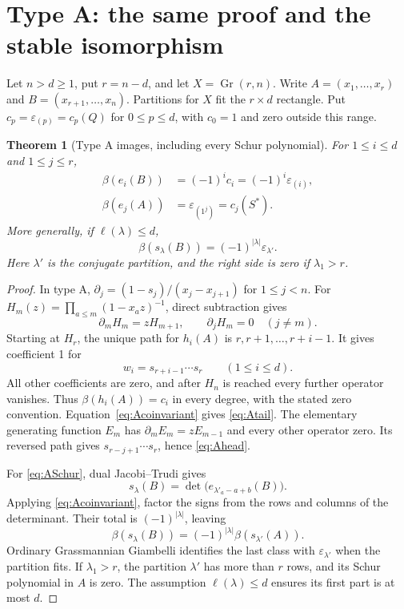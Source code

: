 \documentclass[11pt,letterpaper]{article}
\newtheorem{theorem}{Theorem}[section]
\theoremstyle{remark}
\newcommand{\eps}{\varepsilon}
\newcommand{\Gr}{\operatorname{Gr}}
\begin{document}
\section{Type A: the same proof and the stable isomorphism}
\label{sec:A}

Let $n>d\geq1$, put $r=n-d$, and let $X=\Gr(r,n)$. Write $A=(x_1,\ldots,x_r)$ and $B=(x_{r+1},\ldots,x_n)$. Partitions for $X$ fit the $r\times d$ rectangle. Put $c_p=\eps_{(p)}=c_p(Q)$ for $0\leq p\leq d$, with $c_0=1$ and zero outside this range.

\begin{theorem}[Type A images, including every Schur polynomial]\label{thm:A}
For $1\leq i\leq d$ and $1\leq j\leq r$,
\begin{align}
 \beta(e_i(B))&=(-1)^i c_i=(-1)^i\eps_{(i)},\label{eq:Atail}\\
 \beta(e_j(A))&=\eps_{(1^j)}=c_j(S^*).\label{eq:Ahead}
\end{align}
More generally, if $\ell(\lambda)\leq d$,
\begin{equation}
 \boxed{\beta(s_\lambda(B))=(-1)^{|\lambda|}\eps_{\lambda'}.}
 \label{eq:ASchur}
\end{equation}
Here $\lambda'$ is the conjugate partition, and the right side is zero if $\lambda_1>r$.
\end{theorem}
\begin{proof}
In type A, $\partial_j=(1-s_j)/(x_j-x_{j+1})$ for $1\leq j<n$. For $H_m(z)=\prod_{a\leq m}(1-x_a z)^{-1}$, direct subtraction gives
\[
 \partial_mH_m=zH_{m+1},\qquad \partial_jH_m=0\quad(j\ne m).
\]
Starting at $H_r$, the unique path for $h_i(A)$ is $r,r+1,\ldots,r+i-1$. It gives coefficient 1 for
\[
 w_i=s_{r+i-1}\cdots s_r\qquad(1\leq i\leq d).
\]
All other coefficients are zero, and after $H_n$ is reached every further operator vanishes. Thus $\beta(h_i(A))=c_i$ in every degree, with the stated zero convention. Equation~\eqref{eq:Acoinvariant} gives \eqref{eq:Atail}. The elementary generating function $E_m$ has $\partial_mE_m=zE_{m-1}$ and every other operator zero. Its reversed path gives $s_{r-j+1}\cdots s_r$, hence \eqref{eq:Ahead}.

For \eqref{eq:ASchur}, dual Jacobi--Trudi gives
\[
 s_\lambda(B)=\det\bigl(e_{\lambda'_a-a+b}(B)\bigr).
\]
Applying \eqref{eq:Acoinvariant}, factor the signs from the rows and columns of the determinant. Their total is $(-1)^{|\lambda|}$, leaving
\[
 \beta(s_\lambda(B))=(-1)^{|\lambda|}\beta(s_{\lambda'}(A)).
\]
Ordinary Grassmannian Giambelli identifies the last class with $\eps_{\lambda'}$ when the partition fits. If $\lambda_1>r$, the partition $\lambda'$ has more than $r$ rows, and its Schur polynomial in $A$ is zero. The assumption $\ell(\lambda)\leq d$ ensures its first part is at most $d$.
\end{proof}
\end{document}
